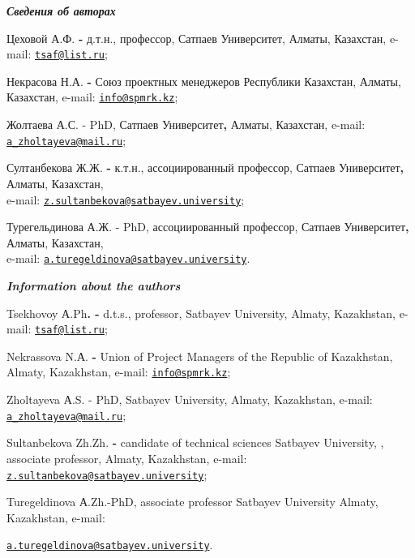 \begin{authorinfo}
\hspace{1em}\emph{{\bfseries Сведения об авторах}}

Цеховой А.Ф. {\bfseries -} д.т.н., профессор, Сатпаев Университет, Алматы,
Казахстан, e-mail: \href{mailto:tsaf@list.ru}{\nolinkurl{tsaf@list.ru}};

Некрасова Н.А. {\bfseries -} Союз проектных менеджеров Республики
Казахстан, Алматы, Казахстан, e-mail:
\href{mailto:info@spmrk.kz}{\nolinkurl{info@spmrk.kz}};

Жолтаева А.С. - PhD, Сатпаев Университет{\bfseries ,} Алматы, Казахстан,
e-mail:
\href{mailto:a_zholtayeva@mail.ru}{\nolinkurl{a\_zholtayeva@mail.ru}};

Султанбекова Ж.Ж. {\bfseries -} к.т.н., ассоциированный профессор, Сатпаев
Университет{\bfseries ,} Алматы, Казахстан, \\e-mail:
\href{mailto:z.sultanbekova@satbayev.university}{\nolinkurl{z.sultanbekova@satbayev.university}};

Турегельдинова А.Ж. - PhD, ассоциированный профессор, Сатпаев
Университет{\bfseries ,} Алматы, Казахстан,\\ e-mail:
\href{mailto:a.turegeldinova@satbayev.university}{\nolinkurl{a.turegeldinova@satbayev.university}}.

\hspace{1em}\emph{{\bfseries Information about the authors}}

Tsekhovoy А.Ph{\bfseries . -} d.t.s., professor, Satbayev University,
Almaty, Kazakhstan, e-mail:
\href{mailto:tsaf@list.ru}{\nolinkurl{tsaf@list.ru}};

Nekrassova N.А. {\bfseries -} Union of Project Managers of the Republic of
Kazakhstan, Almaty, Kazakhstan, e-mail:
\href{mailto:info@spmrk.kz}{\nolinkurl{info@spmrk.kz}};

Zholtayeva А.S. - PhD, Satbayev University, Almaty, Kazakhstan, e-mail:
\href{mailto:a_zholtayeva@mail.ru}{\nolinkurl{a\_zholtayeva@mail.ru}};

Sultanbekova Zh.Zh. {\bfseries -} candidate of technical sciences Satbayev
University, , associate professor, Almaty, Kazakhstan, e-mail:
\href{mailto:z.sultanbekova@satbayev.university}{\nolinkurl{z.sultanbekova@satbayev.university}};

Turegeldinova А.Zh.-PhD, associate professor Satbayev University Almaty,
Kazakhstan, e-mail:

\href{mailto:a.turegeldinova@satbayev.university}{\nolinkurl{a.turegeldinova@satbayev.university}}.
\end{authorinfo}
